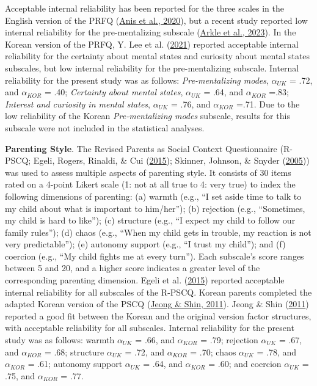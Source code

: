 \documentclass[
]{article}
\begin{document}
Acceptable internal reliability has been reported for the three scales in the English version of the PRFQ (\protect\hyperlink{ref-Anis2020}{Anis et al., 2020}), but a recent study reported low internal reliability for the pre-mentalizing subscale (\protect\hyperlink{ref-Arkle2023}{Arkle et al., 2023}). In the Korean version of the PRFQ, Y. Lee et al. (\protect\hyperlink{ref-Lee2021}{2021}) reported acceptable internal reliability for the certainty about mental states and curiosity about mental states subscales, but low internal reliability for the pre-mentalizing subscale. Internal reliability for the present study was as follows: \emph{Pre-mentalizing modes}, \(\alpha_{UK}\) = .72, and \(\alpha_{KOR}\) = .40; \emph{Certainty about mental states}, \(\alpha_{UK}\) = .64, and \(\alpha_{KOR}\) =.83; \emph{Interest and curiosity in mental states}, \(\alpha_{UK}\) = .76, and \(\alpha_{KOR}\) =.71. Due to the low reliability of the Korean \emph{Pre-mentalizing modes} subscale, results for this subscale were not included in the statistical analyses.

\textbf{Parenting Style}. The Revised Parents as Social Context Questionnaire (R-PSCQ; Egeli, Rogers, Rinaldi, \& Cui (\protect\hyperlink{ref-Egeli2015}{2015}); Skinner, Johnson, \& Snyder (\protect\hyperlink{ref-Skinner2005}{2005})) was used to assess multiple aspects of parenting style. It consists of 30 items rated on a 4-point Likert scale (1: not at all true to 4: very true) to index the following dimensions of parenting: (a) warmth (e.g., ``I set aside time to talk to my child about what is important to him/her''); (b) rejection (e.g., ``Sometimes, my child is hard to like''); (c) structure (e.g., ``I expect my child to follow our family rules''); (d) chaos (e.g., ``When my child gets in trouble, my reaction is not very predictable''); (e) autonomy support (e.g., ``I trust my child''); and (f) coercion (e.g., ``My child fights me at every turn''). Each subscale's score ranges between 5 and 20, and a higher score indicates a greater level of the corresponding parenting dimension. Egeli et al. (\protect\hyperlink{ref-Egeli2015}{2015}) reported acceptable internal reliability for all subscales of the R-PSCQ. Korean parents completed the adapted Korean version of the PSCQ (\protect\hyperlink{ref-Jeong2011}{Jeong \& Shin, 2011}). Jeong \& Shin (\protect\hyperlink{ref-Jeong2011}{2011}) reported a good fit between the Korean and the original version factor structures, with acceptable reliability for all subscales. Internal reliability for the present study was as follows: warmth \(\alpha_{UK}\) = .66, and \(\alpha_{KOR}\) = .79; rejection \(\alpha_{UK}\) = .67, and \(\alpha_{KOR}\) = .68; structure \(\alpha_{UK}\) = .72, and \(\alpha_{KOR}\) = .70; chaos \(\alpha_{UK}\) = .78, and \(\alpha_{KOR}\) = .61; autonomy support \(\alpha_{UK}\) = .64, and \(\alpha_{KOR}\) = .60; and coercion \(\alpha_{UK}\) = .75, and \(\alpha_{KOR}\) = .77.
\end{document}
